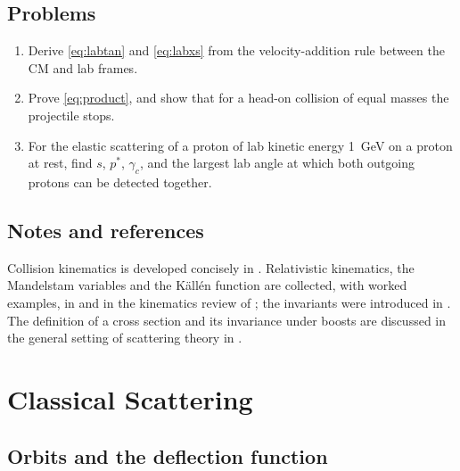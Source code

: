 \documentclass[11pt,a4paper]{book}
\numberwithin{equation}{chapter}
\begin{document}
\section{Problems}
\begin{enumerate}
  \item Derive \eqref{eq:labtan} and \eqref{eq:labxs} from the velocity-addition
        rule between the CM and lab frames.
  \item Prove \eqref{eq:product}, and show that for a head-on collision of
        equal masses the projectile stops.
  \item For the elastic scattering of a proton of lab kinetic energy 1~GeV on a
        proton at rest, find $s$, $p^*$, $\gamma_c$, and the largest lab angle
        at which both outgoing protons can be detected together.
\end{enumerate}

\section*{Notes and references}
Collision kinematics is developed concisely in \cite{LL1}. Relativistic kinematics, the Mandelstam variables and the K\"all\'en function are collected, with worked examples, in \cite{BK,Hagedorn} and in the kinematics review of \cite{PDG}; the invariants were introduced in \cite{Mandelstam58}. The definition of a cross section and its invariance under boosts are discussed in the general setting of scattering theory in \cite{Weinberg}.

\chapter{Classical Scattering}

\section{Orbits and the deflection function}
\end{document}
